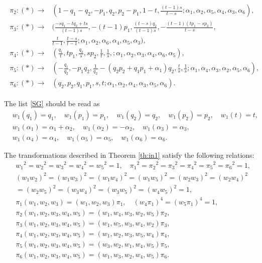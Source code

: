 \begin{thm}
\begin{align}
\begin{split}
        \pi_2:(*) \rightarrow& (1-q_1-q_2,-p_1,q_2,p_2-p_1,1-t,\frac{(t-1)s}{t-s};\alpha_1,\alpha_2,\alpha_5,\alpha_4,\alpha_3,\alpha_6),\\
        \pi_3:(*) \rightarrow& (\frac{-sq_1-tq_2+ts}{(t-1)s},-(t-1)p_1,\frac{(t-s)q_2}{(t-1)s},-\frac{(t-1)(tp_1-sp_2)}{t-s},\\
        &\frac{t}{t-1},\frac{t-s}{t-1};\alpha_1,\alpha_2,\alpha_6,\alpha_4,\alpha_5,\alpha_3),\\
        \pi_4:(*) \rightarrow& (\frac{q_1}{t},tp_1,\frac{q_2}{s},sp_2,\frac{1}{t},\frac{1}{s},;\alpha_1,\alpha_2,\alpha_3,\alpha_4,\alpha_6,\alpha_5),\\
        \pi_5:(*) \rightarrow& (-\frac{q_1}{q_2},-p_1q_2,\frac{1}{q_2}-(q_2p_2+q_1p_1+\alpha_1)q_2,\frac{t}{s},\frac{1}{s};\alpha_1,\alpha_4,\alpha_3,\alpha_2,\alpha_5,\alpha_6),\\
        \pi_6:(*) \rightarrow& (q_2,p_2,q_1,p_1,s,t;\alpha_1,\alpha_2,\alpha_4,\alpha_3,\alpha_5,\alpha_6).
        \end{split}
\end{align}
\end{thm}
The list \eqref{SG} should be read as
\begin{align*}
&w_1(q_1)=q_1, \quad w_1(p_1)=p_1, \quad w_1(q_2)=q_2, \quad w_1(p_2)=p_2, \quad w_1(t)=t,\\
&w_1(\alpha_1)=\alpha_1+\alpha_2, \quad w_1(\alpha_2)=-\alpha_2, \quad w_1(\alpha_3)=\alpha_3,\\
&w_1(\alpha_4)=\alpha_4, \quad w_1(\alpha_5)=\alpha_5, \quad w_1(\alpha_6)=\alpha_6.
\end{align*}





\begin{Lemma}
The transformations described in Theorem \ref{th:in1} satisfy the following relations\rm{:\rm}
\begin{align*}
&{w_1}^2={w_2}^2={w_3}^2={w_4}^2={w_5}^2=1, \quad {{\pi}_1}^2={{\pi}_2}^2={{\pi}_3}^2={{\pi}_4}^2={{\pi}_5}^2={{\pi}_6}^2=1,\\
&(w_1w_2)^2=(w_1w_3)^2=(w_1w_4)^2=(w_1w_5)^2=(w_2w_3)^2=(w_2w_4)^2\\
&=(w_2w_5)^2=(w_3w_4)^2=(w_3w_5)^2=(w_4w_5)^2=1,\\
&{\pi_1}(w_1,w_2,w_3)=(w_1,w_2,w_3){\pi_1}, \quad (w_4\pi_1)^4=(w_5\pi_1)^4=1,\\
&{\pi}_2(w_1,w_2,w_3,w_4,w_5)=(w_1,w_4,w_3,w_2,w_5){\pi}_2,\\
&{\pi}_3(w_1,w_2,w_3,w_4,w_5)=(w_1,w_5,w_3,w_4,w_2){\pi}_3,\\
&{\pi}_4(w_1,w_2,w_3,w_4,w_5)=(w_1,w_2,w_3,w_5,w_4){\pi}_4,\\
&{\pi}_5(w_1,w_2,w_3,w_4,w_5)=(w_3,w_2,w_1,w_4,w_5){\pi}_5,\\
&{\pi}_6(w_1,w_2,w_3,w_4,w_5)=(w_1,w_3,w_2,w_4,w_5){\pi}_6.
\end{align*}
\end{Lemma}







